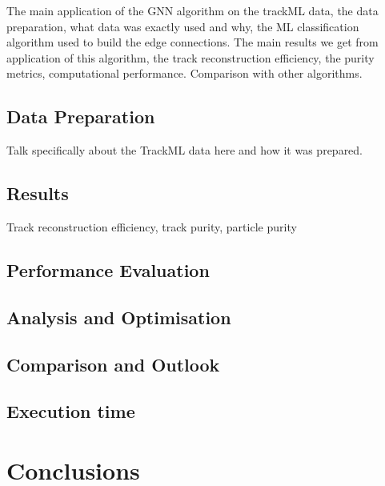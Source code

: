 The main application of the GNN algorithm on the trackML data, the data preparation, what data was exactly used and why, the ML classification algorithm used to build the edge connections. The main results we get from application of this algorithm, the track reconstruction efficiency, the purity metrics, computational performance. Comparison with other algorithms.

\subsection{Data Preparation}

Talk specifically about the TrackML data here and how it was prepared.


\subsection{Results}
Track reconstruction efficiency, track purity, particle purity
\subsection{Performance Evaluation}
\subsection{Analysis and Optimisation}
\subsection{Comparison and Outlook}
\subsection{Execution time}

\section{Conclusions}
